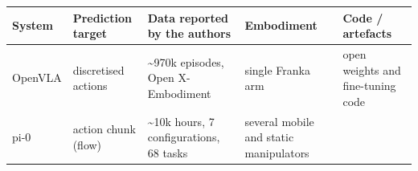 \documentclass[
  10pt,
  english,
]{article}
\begin{document}
\begin{longtable}[]{@{}lllll@{}}
\toprule
\begin{minipage}[b]{0.17\columnwidth}\raggedright
System\strut
\end{minipage} & \begin{minipage}[b]{0.17\columnwidth}\raggedright
Prediction target\strut
\end{minipage} & \begin{minipage}[b]{0.17\columnwidth}\raggedright
Data reported by the authors\strut
\end{minipage} & \begin{minipage}[b]{0.17\columnwidth}\raggedright
Embodiment\strut
\end{minipage} & \begin{minipage}[b]{0.17\columnwidth}\raggedright
Code / artefacts\strut
\end{minipage}\tabularnewline
\midrule
\endhead
\begin{minipage}[t]{0.17\columnwidth}\raggedright
OpenVLA \citep{openvla}\strut
\end{minipage} & \begin{minipage}[t]{0.17\columnwidth}\raggedright
discretised actions\strut
\end{minipage} & \begin{minipage}[t]{0.17\columnwidth}\raggedright
\textasciitilde970k episodes, Open X-Embodiment\strut
\end{minipage} & \begin{minipage}[t]{0.17\columnwidth}\raggedright
single Franka arm\strut
\end{minipage} & \begin{minipage}[t]{0.17\columnwidth}\raggedright
open weights and fine-tuning code\strut
\end{minipage}\tabularnewline
\begin{minipage}[t]{0.17\columnwidth}\raggedright
pi-0 \citep{pi0}\strut
\end{minipage} & \begin{minipage}[t]{0.17\columnwidth}\raggedright
action chunk (flow)\strut
\end{minipage} & \begin{minipage}[t]{0.17\columnwidth}\raggedright
\textasciitilde10k hours, 7 configurations, 68 tasks\strut
\end{minipage} & \begin{minipage}[t]{0.17\columnwidth}\raggedright
several mobile and static manipulators\strut
\end{minipage} & \begin{minipage}[t]{0.17\columnwidth}\raggedright

\end{minipage}
\end{longtable}
\end{document}
